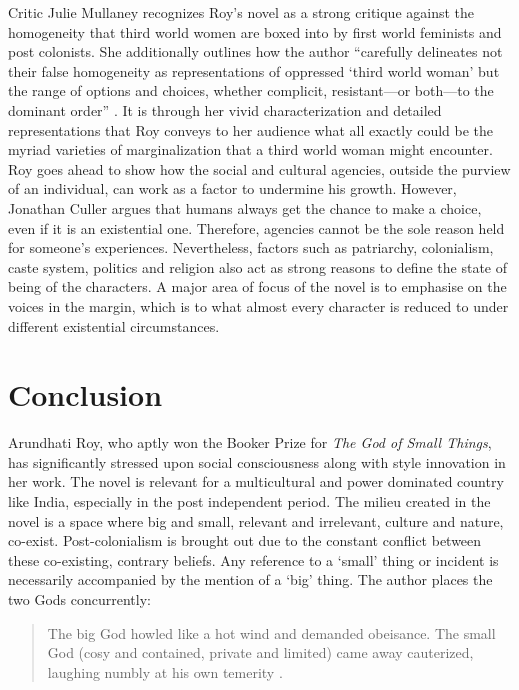Critic Julie Mullaney recognizes Roy's novel as a strong critique against the homogeneity that third world women are boxed into by first world feminists and post colonists. She additionally outlines how the author ``carefully delineates not their false homogeneity as representations of oppressed `third world woman' but the range of options and choices, whether complicit, resistant—or both—to the dominant order'' \parencite[11]{Roy1997}. It is through her vivid characterization and detailed representations that Roy conveys to her audience what all exactly could be the myriad varieties of marginalization that a third world woman might encounter. Roy goes ahead to show how the social and cultural agencies, outside the purview of an individual, can work as a factor to undermine his growth. However, Jonathan Culler argues that humans always get the chance to make a choice, even if it is an existential one. Therefore, agencies cannot be the sole reason held for someone's experiences. Nevertheless, factors such as patriarchy, colonialism, caste system, politics and religion also act as strong reasons to define the state of being of the characters. A major area of focus of the novel is to emphasise on the voices in the margin, which is to what almost every character is reduced to under different existential circumstances. 

\section{Conclusion}

Arundhati Roy, who aptly won the Booker Prize for \emph{The God of Small Things}, has significantly stressed upon social consciousness along with style innovation in her work. The novel is relevant for a multicultural and power dominated country like India, especially in the post independent period. The milieu created in the novel is a space where big and small, relevant and irrelevant, culture and nature, co-exist. Post-colonialism is brought out due to the constant conflict between these co-existing, contrary beliefs. Any reference to a `small' thing or incident is necessarily accompanied by the mention of a `big' thing. The author places the two Gods concurrently: 

\begin{quote}
  The big God howled like a hot wind and demanded obeisance. The small God (cosy and contained, private and limited) came away cauterized, laughing numbly at his own temerity \parencite[19]{Roy1997}.
\end{quote}


